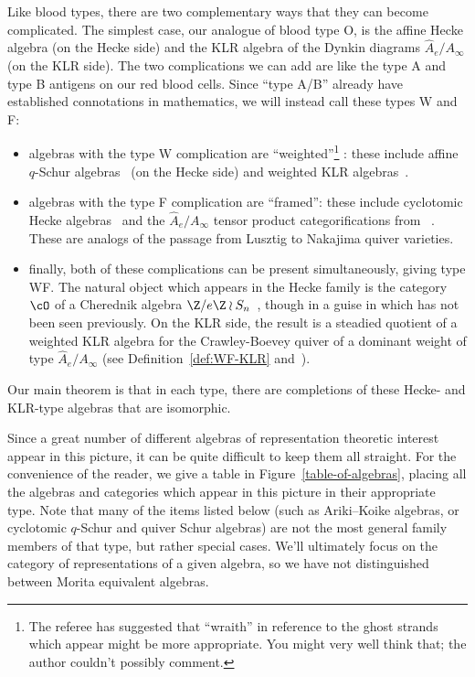 Like blood types, there are two complementary ways that they can
become complicated. The simplest case, our analogue of blood type O,
is the affine Hecke algebra (on the Hecke side) and the KLR algebra of
the Dynkin diagrams $\hat{A}_e/A_\infty$ (on the KLR side). The two complications we can
add are like the type A and type B antigens on our red blood cells.
Since ``type A/B'' already have established connotations in
mathematics, we will instead call these types W and F:
\begin{itemize} 
\item algebras with the type W complication are ``weighted''\footnote{The referee has suggested that
 ``wraith'' in reference to the ghost strands which appear might be
 more appropriate. You might very well think that; the author couldn't possibly comment.} : these
 include affine $q$-Schur algebras~\cite{GreenSchur} (on the Hecke side) and weighted KLR
 algebras~\cite{WebwKLR}.
\item algebras with the type F complication are 
 ``framed'': these include cyclotomic Hecke algebras~\cite{AK} and the
 $\hat{A}_e/A_\infty$ tensor product categorifications from
~\cite{Webmerged}. These are analogs of the passage from Lusztig to
 Nakajima quiver varieties.
\item finally, both of these complications can be present
 simultaneously, giving type WF. The natural object which appears in
 the Hecke family is the category $\cO$ of a Cherednik algebra $\Z/e\Z\wr
 S_n$~\cite{GGOR}, though in a guise in which has not been seen previously. On
 the KLR side, the result is a steadied quotient of a weighted KLR
 algebra for the Crawley-Boevey quiver of a dominant weight of type
 $\hat{A}_e/A_\infty$ (see Definition~\ref{def:WF-KLR} and~\cite[\S~3.1]{WebwKLR}).
\end{itemize}

Our main theorem is that in each type, there are completions of these
Hecke- and KLR-type algebras that are isomorphic.

Since a great number of different algebras of representation theoretic
interest appear in this picture, it can be quite difficult to keep
them all straight. For the convenience of the reader, we give a table
in Figure~\ref{table-of-algebras}, placing all the algebras and categories which appear in this picture in their
appropriate type. Note that many of the items listed below (such as
Ariki--Koike algebras, or cyclotomic $q$-Schur and quiver Schur
algebras) are not the most general family members of that type, but
rather special cases. We'll ultimately focus on the category of
representations of a given algebra, so we have not
distinguished between Morita equivalent algebras. 

